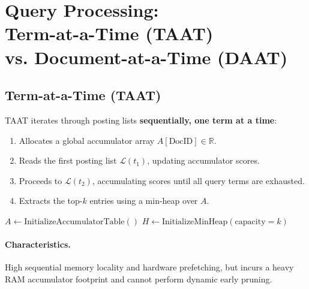 \FloatBarrier
\section[Query Processing: TAAT vs. DAAT]{Query Processing:\\ Term-at-a-Time (TAAT)\\ vs. Document-at-a-Time (DAAT)}
\label{sec:taat-vs-daat-en}

\subsection{Term-at-a-Time (TAAT)}
TAAT iterates through posting lists \textbf{sequentially, one term at a time}:
\begin{enumerate}
    \item Allocates a global accumulator array $A[\text{DocID}] \in \mathbb{R}$.
    \item Reads the first posting list $\mathcal{L}(t_1)$, updating accumulator scores.
    \item Proceeds to $\mathcal{L}(t_2)$, accumulating scores until all query terms are exhausted.
    \item Extracts the top-$k$ entries using a min-heap over $A$.
\end{enumerate}

\begin{algorithm}[H]
\caption{Term-at-a-Time (TAAT)}
\label{alg:taat-en}

$A \gets \text{InitializeAccumulatorTable}()$\;
$H \gets \text{InitializeMinHeap}(\text{capacity}=k)$\;
\;
\end{algorithm}

\paragraph{Characteristics.} High sequential memory locality and hardware prefetching, but incurs a heavy RAM accumulator footprint and cannot perform dynamic early pruning.

